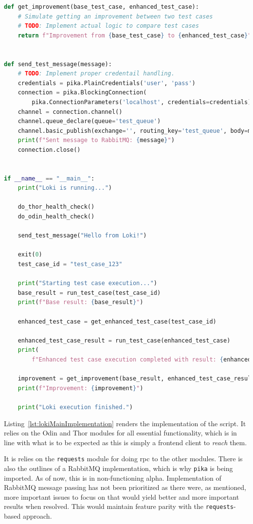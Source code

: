 \begin{lstlisting}[caption={loki/main.py, The implementation of the Loki script.}, label={lst:lokiMainImplementation}, language={Python}]
def get_improvement(base_test_case, enhanced_test_case):
    # Simulate getting an improvement between two test cases
    # TODO: Implement actual logic to compare test cases
    return f"Improvement from {base_test_case} to {enhanced_test_case}"


def send_test_message(message):
    # TODO: Implement proper credentail handling.
    credentials = pika.PlainCredentials('user', 'pass')
    connection = pika.BlockingConnection(
        pika.ConnectionParameters('localhost', credentials=credentials))
    channel = connection.channel()
    channel.queue_declare(queue='test_queue')
    channel.basic_publish(exchange='', routing_key='test_queue', body=message)
    print(f"Sent message to RabbitMQ: {message}")
    connection.close()


if __name__ == "__main__":
    print("Loki is running...")

    do_thor_health_check()
    do_odin_health_check()

    send_test_message("Hello from Loki!")

    exit(0)
    test_case_id = "test_case_123"

    print("Starting test case execution...")
    base_result = run_test_case(test_case_id)
    print(f"Base result: {base_result}")

    enhanced_test_case = get_enhanced_test_case(test_case_id)

    enhanced_test_case_result = run_test_case(enhanced_test_case)
    print(
        f"Enhanced test case execution completed with result: {enhanced_test_case_result}")

    improvement = get_improvement(base_result, enhanced_test_case_result)
    print(f"Improvement: {improvement}")

    print("Loki execution finished.")

\end{lstlisting}


Listing~\ref{lst:lokiMainImplementation} renders the implementation of the
script. It relies on the Odin and Thor modules for all essential functionality,
which is in line with what is to be expected as this is simply a frontend client
to \emph{reach} them.

It is relies on the \texttt{requests} module for doing \acrfull{rpc} to the
other modules. There is also the outlines of a RabbitMQ implementation, which is
why \texttt{pika} is being imported. As of now, this is in non-functioning
alpha. Implementation of RabbitMQ message passing has not been prioritized as
there were, as mentioned, more important issues to focus on that would yield
better and more important results when resolved. This would maintain feature
parity with the \texttt{requests}-based approach.